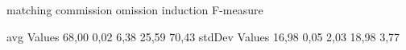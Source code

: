                 matching commission   omission  induction    F-measure   

avg Values      68,00       0,02       6,38      25,59         70,43      
stdDev Values    16,98       0,05       2,03      18,98         3,77

